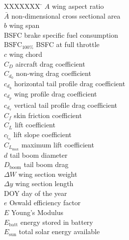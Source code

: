 \begin{multicols}{2}
\small

\begin{tabbing}
  XXXXXXX \= \kill%
$A$ \> wing aspect ratio \\
$\bar{A}$ \> non-dimensional cross sectional area \\
$b$ \> wing span \\ %
BSFC \> brake specific fuel consumption \\ %
$\text{BSFC}_{100\%}$ \> BSFC at full throttle \\ %
$c$ \> wing chord \\ %
$C_D$ \> aircraft drag coefficient \\
$C_{d_0}$ \> non-wing drag coefficient \\
$c_{d_{\text{h}}}$ \> horizontal tail profile drag coefficient \\
$c_{d_p}$ \> wing profile drag coefficient \\
$c_{d_{\text{v}}}$ \> vertical tail profile drag coefficient \\
$C_f$ \> skin friction coefficient \\
$C_L$ \> lift coefficient \\
$c_{l_{\alpha}}$ \> lift slope coefficient \\
$C_{L_{\text{max}}}$ \> maximum lift coefficient \\
$d$ \> tail boom diameter \\ %
$D_{\text{boom}}$ \> tail boom drag \\%
$\Delta W$ \> wing section weight \\ %
$\Delta y$ \> wing section length \\ %
DOY \> day of the year \\
$e$ \> Oswald efficiency factor \\
$E$ \> Young's Modulus \\ %
$E_{\text{batt}}$ \> energy stored in battery \\ %
$E_{\text{sun}}$ \> total solar energy available \\ %

\end{tabbing}
\end{multicols}
